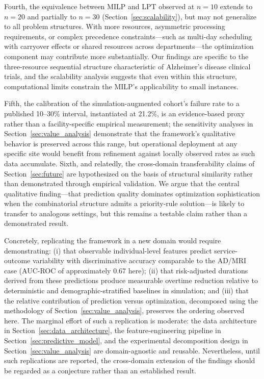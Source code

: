 \documentclass[11pt,a4paper]{article}
\begin{document}
Fourth, the equivalence between MILP and LPT observed at $n = 10$ extends to $n = 20$ and partially to $n = 30$ (Section~\ref{sec:scalability}), but may not generalize to all problem structures. With more resources, asymmetric processing requirements, or complex precedence constraints---such as multi-day scheduling with carryover effects or shared resources across departments---the optimization component may contribute more substantially. Our findings are specific to the three-resource sequential structure characteristic of Alzheimer's disease clinical trials, and the scalability analysis suggests that even within this structure, computational limits constrain the MILP's applicability to small instances.

Fifth, the calibration of the simulation-augmented cohort's failure rate to a published 10--30\% interval, instantiated at 21.2\%, is an evidence-based proxy rather than a facility-specific empirical measurement; the sensitivity analyses in Section~\ref{sec:value_analysis} demonstrate that the framework's qualitative behavior is preserved across this range, but operational deployment at any specific site would benefit from refinement against locally observed rates as such data accumulate. Sixth, and relatedly, the cross-domain transferability claims of Section~\ref{sec:future} are hypothesized on the basis of structural similarity rather than demonstrated through empirical validation. We argue that the central qualitative finding---that prediction quality dominates optimization sophistication when the combinatorial structure admits a priority-rule solution---is likely to transfer to analogous settings, but this remains a testable claim rather than a demonstrated result. 

Concretely, replicating the framework in a new domain would require demonstrating: (i) that observable individual-level features predict service-outcome variability with discriminative accuracy comparable to the AD/MRI case (AUC-ROC of approximately 0.67 here); (ii) that risk-adjusted durations derived from these predictions produce measurable overtime reduction relative to deterministic and demographic-stratified baselines in simulation; and (iii) that the relative contribution of prediction versus optimization, decomposed using the methodology of Section~\ref{sec:value_analysis}, preserves the ordering observed here. The marginal effort of such a replication is moderate: the data architecture in Section~\ref{sec:data_architecture}, the feature-engineering pipeline in Section~\ref{sec:predictive_model}, and the experimental decomposition design in Section~\ref{sec:value_analysis} are domain-agnostic and reusable. Nevertheless, until such replications are reported, the cross-domain extension of the findings should be regarded as a conjecture rather than an established result.
\end{document}
